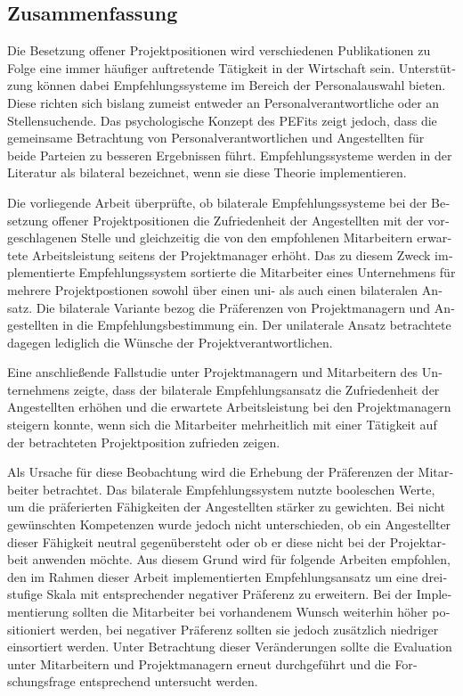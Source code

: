 \begin{otherlanguage}{ngerman}
\chapter*{Zusammenfassung}
Die Besetzung offener Projektpositionen wird verschiedenen Publikationen zu Folge eine immer häufiger auftretende Tätigkeit in der Wirtschaft sein. Unterstützung können dabei Empfehlungssysteme im Bereich der Personalauswahl bieten. Diese richten sich bislang zumeist entweder an Personalverantwortliche oder an Stellensuchende. Das psychologische Konzept des \aclp{PEFit} zeigt jedoch, dass die gemeinsame Betrachtung von Personalverantwortlichen und Angestellten für beide Parteien zu besseren Ergebnissen führt. Empfehlungssysteme werden in der Literatur als bilateral bezeichnet, wenn sie diese Theorie implementieren.

Die vorliegende Arbeit überprüfte, ob bilaterale Empfehlungssysteme bei der Besetzung offener Projektpositionen die Zufriedenheit der Angestellten mit der vorgeschlagenen Stelle und gleichzeitig die von den empfohlenen Mitarbeitern erwartete Arbeitsleistung seitens der Projektmanager erhöht. Das zu diesem Zweck implementierte Empfehlungssystem sortierte die Mitarbeiter eines Unternehmens für mehrere Projektpostionen sowohl über einen uni- als auch einen bilateralen Ansatz. Die bilaterale Variante bezog die Präferenzen von Projektmanagern und Angestellten in die Empfehlungsbestimmung ein. Der unilaterale Ansatz betrachtete dagegen lediglich die Wünsche der Projektverantwortlichen.

Eine anschließende Fallstudie unter Projektmanagern und Mitarbeitern des Unternehmens zeigte, dass der bilaterale Empfehlungsansatz die Zufriedenheit der Angestellten erhöhen und die erwartete Arbeitsleistung bei den Projektmanagern steigern konnte, wenn sich die Mitarbeiter mehrheitlich mit einer Tätigkeit auf der betrachteten Projektposition zufrieden zeigen.

Als Ursache für diese Beobachtung wird die Erhebung der Präferenzen der Mitarbeiter betrachtet. Das bilaterale Empfehlungssystem nutzte booleschen Werte, um die präferierten Fähigkeiten der Angestellten stärker zu gewichten. Bei nicht gewünschten Kompetenzen wurde jedoch nicht unterschieden, ob ein Angestellter dieser Fähigkeit neutral gegenübersteht oder ob er diese nicht bei der Projektarbeit anwenden möchte. Aus diesem Grund wird für folgende Arbeiten empfohlen, den im Rahmen dieser Arbeit implementierten Empfehlungsansatz um eine dreistufige Skala mit entsprechender negativer Präferenz zu erweitern. Bei der Implementierung sollten die Mitarbeiter bei vorhandenem Wunsch weiterhin höher positioniert werden, bei negativer Präferenz sollten sie jedoch zusätzlich niedriger einsortiert werden. Unter Betrachtung dieser Veränderungen sollte die Evaluation unter Mitarbeitern und Projektmanagern erneut durchgeführt und die Forschungsfrage entsprechend untersucht werden.
\end{otherlanguage}
